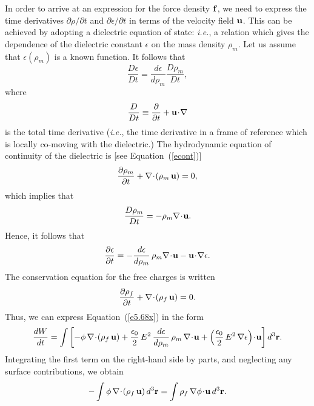 In order to arrive at an expression for the force density ${\bf f}$, we
need to express the time derivatives $\partial\rho/\partial t$ and
$\partial\epsilon/\partial t$ in terms of the velocity field ${\bf u}$. 
This can be achieved by adopting a dielectric equation of state:
{\em i.e.}, a relation which gives the dependence of the dielectric
constant $\epsilon$  on the mass density $\rho_m$. Let us assume that 
$\epsilon(\rho_m)$ is a known function. It follows that
\begin{equation}
\frac{D\epsilon}{Dt} = \frac{d\epsilon}{d\rho_m}
\frac{D\rho_m}{Dt},
\end{equation}
where 
\begin{equation}
\frac{D}{Dt} \equiv \frac{\partial}{\partial t} + {\bf u}\!\cdot\!\nabla
\end{equation}
is the total time derivative ({\em i.e.}, the time
derivative in a frame of reference which
is locally co-moving with the dielectric.) 
The hydrodynamic equation of continuity of the dielectric is [see Equation~(\ref{econt})]
\begin{equation}
\frac{\partial \rho_m}{\partial t} + \nabla\!\cdot\!(\rho_m\, {\bf u}) = 0,
\end{equation}
which implies that
\begin{equation}
\frac{D\rho_m}{Dt} = - \rho_m \nabla\!\cdot\!{\bf u}.
\end{equation}
Hence, it follows that
\begin{equation}
\frac{\partial \epsilon}{\partial t} = - \frac{d\epsilon}{d\rho_m}\,
\rho_m \nabla\!\cdot\!{\bf u} - {\bf u} \!\cdot\!\nabla\epsilon.
\end{equation}
The conservation equation for the free charges is written
\begin{equation}
\frac{\partial \rho_f}{\partial t} + \nabla\!\cdot\!(\rho_f\,
{\bf u}) = 0.
\end{equation}
Thus, we can express Equation~(\ref{e5.68x}) in the form
\begin{equation}\label{e5.75x}
\frac{dW}{dt} = \int\left[-\phi\,\nabla\!\cdot\!(\rho_f\,{\bf u}) + \frac{\epsilon_0}{2}\,E^2\,\frac{d\epsilon}{d\rho_m} \,\rho_m\,\nabla\!\cdot\!{\bf u} 
+ \left(\frac{\epsilon_0}{2} \,E^2\,\nabla\epsilon\right)
\!\cdot\! {\bf u}\right]d^3{\bf r}.
\end{equation}
Integrating the first term on the right-hand side by parts, and neglecting any surface contributions,
we obtain
\begin{equation}
-\int\phi\,\nabla\!\cdot\!(\rho_f\,{\bf u}) \,d^3{\bf r} = 
\int \rho_f \,\nabla\phi\!\cdot\! {\bf u}\,d^3{\bf r}.
\end{equation}
